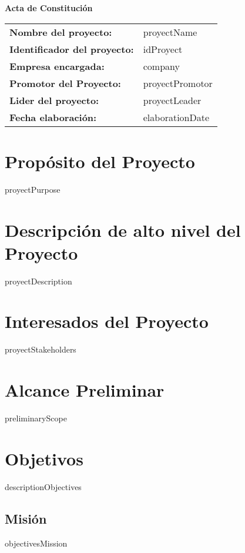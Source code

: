 \documentclass[12pt]{article}
\begin{document}
    \begin{center}
    {\huge\textbf{Acta de Constitución}}\\[13cm]
    \end{center}

    \begin{tabular}{ll}
        \textbf{Nombre del proyecto:} & {{proyectName}} \\[0.3cm]
        \textbf{Identificador del proyecto:} & {{idProyect}} \\[0.3cm]
        \textbf{Empresa encargada:} & {{company}} \\[0.3cm]
        \textbf{Promotor del Proyecto:} & {{proyectPromotor}} \\[0.3cm]
        \textbf{Lider del proyecto:} & {{proyectLeader}} \\[0.3cm]
        \textbf{Fecha elaboración:} & {{elaborationDate}} \\
    \end{tabular}
    \newpage

    \tableofcontents
    \newpage

    \section{Propósito del Proyecto}
    {{proyectPurpose}}

    \section{Descripción de alto nivel del Proyecto}
    {{proyectDescription}}

    \section{Interesados del Proyecto}
    {{proyectStakeholders}}

    \section{Alcance Preliminar}
    {{preliminaryScope}}

    \section{Objetivos}
    {{descriptionObjectives}}
    \subsection{Misión}
    {{objectivesMission}}
\end{document}
